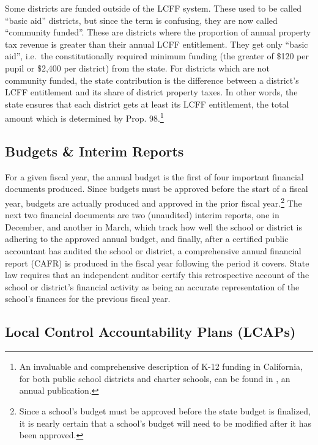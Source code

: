 Some districts are funded outside of the LCFF system. These used to be called ``basic aid'' districts, but since the term is confusing, they are now called ``community funded''. These are districts where the proportion of annual property tax revenue is greater than their annual LCFF entitlement. They get only ``basic aid'', i.e.~the constitutionally required minimum funding (the greater of \$120 per pupil or \$2,400 per district) from the state. For districts which are not community funded, the state contribution is the difference between a district's LCFF entitlement and its share of district property taxes. In other words, the state ensures that each district gets at least its LCFF entitlement, the total amount which is determined by Prop. 98.\footnote{An invaluable and comprehensive description of K-12 funding in California, for both public school districts and charter schools, can be found in \textcite{Aguinaldo.etal2022}, an annual publication.}

\subsection{Budgets \& Interim Reports}\label{sec:budgets}\indent

For a given fiscal year, the annual budget is the first of four important financial documents produced. Since budgets must be approved before the start of a fiscal year, budgets are actually produced and approved in the prior fiscal year.\footnote{Since a school's budget must be approved before the state budget is finalized, it is nearly certain that a school's budget will need to be modified after it has been approved.} The next two financial documents are two (unaudited) interim reports, one in December, and another in March,  which track how well the school or district is adhering to the approved annual budget, and finally, after a certified public accountant has audited the school or district, a comprehensive annual financial report (CAFR) is produced in the fiscal year following the period it covers. State law requires that an independent auditor certify this retrospective account of the school or district's financial activity as being an accurate representation of the school's finances for the previous fiscal year.

\subsection{Local Control Accountability Plans (LCAPs)}\label{sec:lcaps}\indent

